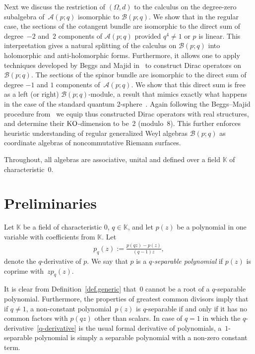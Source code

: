 \documentclass[10pt,a4paper]{amsart}
\numberwithin{equation}{section}
\def\Weyl#1#2{{\mathcal{B}}(#1;#2)}
\def\AWeyl#1#2{{\mathcal{A}}(#1;#2)}
\begin{document}
Next we discuss the restriction of $(\Omega, d)$ to the calculus on the degree-zero subalgebra of~$\AWeyl p q$ isomorphic to $\Weyl p q$. We show that in the regular case, the sections of the cotangent bundle are isomorphic to the direct sum of degree~$-2$ and~$2$ components of $\AWeyl p q$ provided $q^4\neq 1$ or $p$ is linear. This interpretation gives a natural splitting of the calculus on $\Weyl p q$ into holomorphic and anti-holomorphic forms. Furthermore, it allows one to apply techniques developed by Beggs and Majid in~\cite{BegMaj:spe} to construct Dirac operators on $\Weyl p q$. The sections of the spinor bundle are isomorphic to the direct sum of degree $-1$ and $1$ components of~$\AWeyl p q$. We show that this direct sum is free as a left (or right) $\Weyl p q$-module, a result that mimics exactly what happens in the case of the standard quantum 2-sphere~\cite{Maj:Rie}. Again following the Beggs--Majid procedure from~\cite{BegMaj:spe} we equip thus constructed Dirac operators with real structures, and determine their ${\rm KO}$-dimension to be~2 (modulo~8). This further enforces heuristic understanding of regular generalized Weyl algebras $\Weyl p q$ as coordinate algebras of noncommutative Riemann surfaces.

Throughout, all algebras are associative, unital and def\/ined over a f\/ield ${\mathbb K}$ of characteris\-tic~0.

\section{Preliminaries}\label{sec.prem}
\begin{Definition}\label{def.generic}
Let ${\mathbb K}$ be a f\/ield of characteristic 0, $q\in {\mathbb K}$, and let $p(z)$ be a polynomial in one variable with coef\/f\/icients from ${\mathbb K}$. Let
\begin{gather}\label{q-derivative}
p_q(z) := \frac{p(qz) -p(z)}{(q -1)z},
\end{gather}
denote the $q$-derivative of $p$. We say that $p$ is a {\em $q$-separable polynomial} if $p(z)$ is coprime with~$zp_q(z)$.
\end{Definition}

It is clear from Def\/inition~\ref{def.generic} that~0 cannot be a root of a $q$-separable polynomial. Furthermore, the properties of greatest common divisors imply that if $q\neq1$, a non-constant polynomial~$p(z)$ is $q$-separable if and only if it has no common factors with $p(qz)$ other than scalars. In case of $q=1$ in which the $q$-derivative~\eqref{q-derivative} is the usual formal derivative of polynomials, a~$1$-separable polynomial is simply a separable polynomial with a non-zero constant term.
\end{document}

